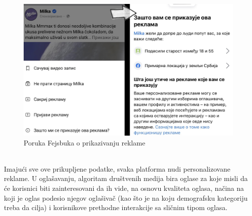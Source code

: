 \documentclass[a4paper]{article}
\begin{document}
	\begin{figure}[h!]
		\begin{center}
			\includegraphics[scale=0.1]{zastoreklama.jpg}
		\end{center}
		\caption{Poruka Fejsbuka o prikazivanju reklame}
		\label{fig:zastoreklama}
	\end{figure}\\
	Imajući sve ove prikupljene podatke, svaka platforma nudi personalizovane reklame.  U oglašavanju, algoritam društvenih medija bira oglase za koje misli da će korisnici biti zainteresovani da ih vide, na osnovu kvaliteta oglasa, načina na koji je oglas podesio njegov 		oglašivač (kao što je na koju demografsku kategoriju treba da cilja) i korisnikove prethodne interakcije sa sličnim tipom oglasa.  \cite{algoritmi}
	
\end{document}
